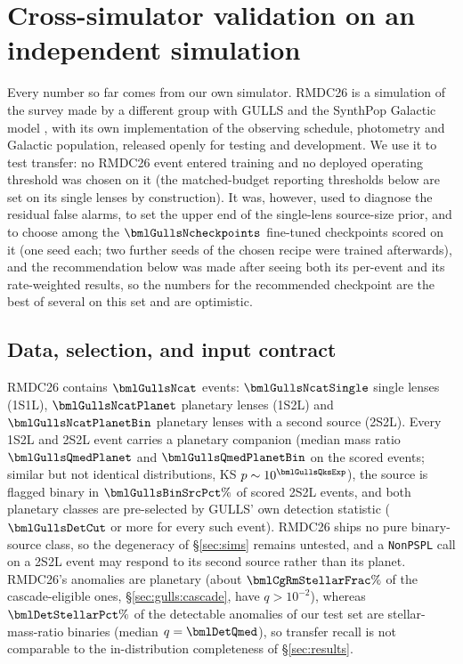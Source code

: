\section{Cross-simulator validation on an independent \Rom{} simulation}\label{sec:gulls}

Every number so far comes from our own simulator. RMDC26 \citep{RGESPIT2026} is a simulation of the
survey made by a different group with GULLS \citep{Penny2013,Penny2019} and the SynthPop Galactic model
\citep{Kluter2025}, with its own implementation of the observing schedule, photometry and Galactic
population, released openly for testing and development. We use it to test transfer: no RMDC26 event entered
training and no deployed operating threshold was chosen on it (the matched-budget reporting thresholds below
are set on its single lenses by construction). It was, however, used to diagnose the residual
false alarms, to set the upper end of the single-lens source-size prior, and to choose among the
$\bmlGullsNcheckpoints$ fine-tuned checkpoints scored on it (one seed each; two further seeds of the chosen
recipe were trained afterwards), and the recommendation below
was made after seeing both its per-event and its rate-weighted results, so the numbers for the recommended
checkpoint are the best of several on this set and are optimistic.

\subsection{Data, selection, and input contract}

RMDC26 contains $\bmlGullsNcat$ events: $\bmlGullsNcatSingle$ single lenses (1S1L),
$\bmlGullsNcatPlanet$ planetary lenses (1S2L) and $\bmlGullsNcatPlanetBin$ planetary lenses with a
second source (2S2L). Every 1S2L and 2S2L event carries a planetary companion (median mass ratio
$\bmlGullsQmedPlanet$ and $\bmlGullsQmedPlanetBin$ on the scored events; similar but not identical
distributions, KS $p \sim 10^{\bmlGullsQksExp}$), the source is flagged binary in $\bmlGullsBinSrcPct\%$
of scored 2S2L events, and both planetary classes are pre-selected by GULLS' own detection statistic
($\bmlGullsDetCut$ or more for every such event). RMDC26 ships no pure binary-source class, so the
\citet{Gaudi1998} degeneracy of \S\ref{sec:sims} remains untested, and a \texttt{NonPSPL} call on a 2S2L
event may respond to its second source rather than its planet. RMDC26's anomalies are planetary (about $\bmlCgRmStellarFrac\%$ of the cascade-eligible ones, \S\ref{sec:gulls:cascade}, have $q > 10^{-2}$),
whereas $\bmlDetStellarPct\%$ of the detectable anomalies of our test set are
stellar-mass-ratio binaries (median $q = \bmlDetQmed$), so transfer recall is not comparable to
the in-distribution completeness of \S\ref{sec:results}.


